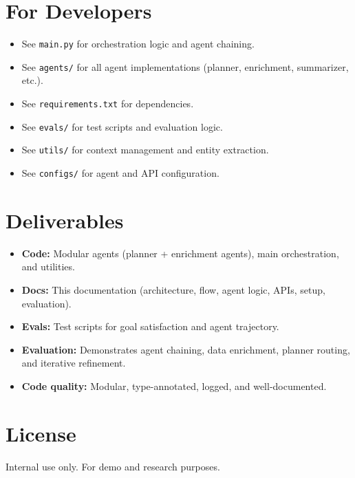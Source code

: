 \documentclass[12pt]{article}
\begin{document}
\section{For Developers}

\begin{itemize}
    \item See \texttt{main.py} for orchestration logic and agent chaining.
    \item See \texttt{agents/} for all agent implementations (planner, enrichment, summarizer, etc.).
    \item See \texttt{requirements.txt} for dependencies.
    \item See \texttt{evals/} for test scripts and evaluation logic.
    \item See \texttt{utils/} for context management and entity extraction.
    \item See \texttt{configs/} for agent and API configuration.
\end{itemize}

\section{Deliverables}

\begin{itemize}
    \item \textbf{Code:} Modular agents (planner + enrichment agents), main orchestration, and utilities.
    \item \textbf{Docs:} This documentation (architecture, flow, agent logic, APIs, setup, evaluation).
    \item \textbf{Evals:} Test scripts for goal satisfaction and agent trajectory.
    \item \textbf{Evaluation:} Demonstrates agent chaining, data enrichment, planner routing, and iterative refinement.
    \item \textbf{Code quality:} Modular, type-annotated, logged, and well-documented.
\end{itemize}

\section{License}

Internal use only. For demo and research purposes.
\end{document}
